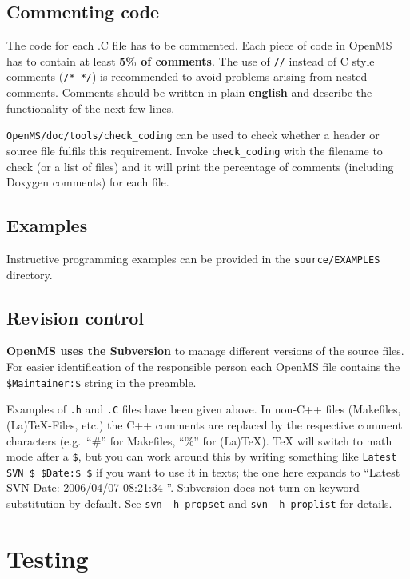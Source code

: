 \documentclass[a4]{article}
\begin{document}
\subsection{Commenting code}

The code for each .C file has to be commented. Each piece of code in OpenMS
has to contain at least {\bf 5\% of comments}. The use of {\tt //} instead of
C style comments ({\tt /* */}) is recommended to avoid problems arising from
nested comments. Comments should be written in plain \textbf{english} and
describe the functionality of the next few lines.

{\tt OpenMS/doc/tools/check\_coding} can be used to check whether a header or 
source file fulfils this requirement. Invoke {\tt check\_coding} with the
filename to check (or a list of files) and it will print the percentage of
comments (including Doxygen comments) for each file.


\subsection{Examples}

Instructive programming examples can be provided in the
\texttt{source/EXAMPLES} directory.


\subsection{Revision control}

\textbf{OpenMS uses the Subversion} to manage different
versions of the source files. For easier identification of the responsible person
each OpenMS file contains the \texttt{\$Maintainer{}:\$} string in the
preamble.

Examples of \texttt{.h} and \texttt{.C} files have been given above.  In
non-C++ files (Makefiles, (La)TeX-Files, etc.) the C++ comments are replaced
by the respective comment characters (e.g.\ ``\#'' for Makefiles, ``\%'' for
(La)TeX).  TeX will switch to math mode after a \texttt{\$}, but you can work
around this by writing something like
\mbox{\texttt{Latest SVN \$ \$Date{}:\$ \$}}
if you want to use it in texts; the one here expands to ``Latest SVN $ $Date:
2006/04/07 08:21:34 $ $''.  Subversion does not turn on keyword substitution
by default.  See \texttt{svn -h propset} and \texttt{svn -h proplist} for
details.



\section{Testing} 
\end{document}

